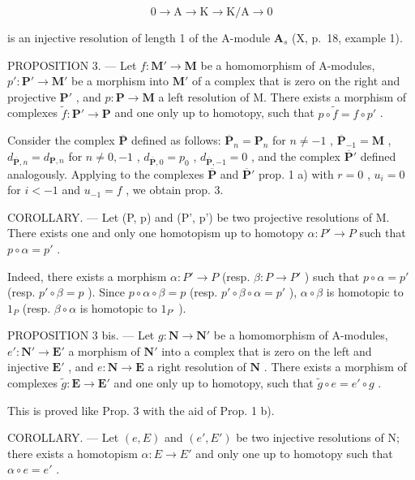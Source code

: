 \[
0 \rightarrow \mathrm{A} \rightarrow \mathrm{K} \rightarrow \mathrm{K/A} \rightarrow 0
\]

is an injective resolution of length 1 of the A-module \(\mathbf{A}_s\) (X, p.~18, example 1).

PROPOSITION 3. — Let \(f: \mathbf{M}' \to \mathbf{M}\) be a homomorphism of A-modules, \(p': \mathbf{P}' \to \mathbf{M}'\) be a morphism into \(\mathbf{M}'\) of a complex that is zero on the right and projective \(\mathbf{P}'\) , and \(p: \mathbf{P} \to \mathbf{M}\) a left resolution of M. There exists a morphism of complexes \(\tilde{f}: \mathbf{P}' \to \mathbf{P}\) and one only up to homotopy, such that \(p \circ \tilde{f} = f \circ p'\) .

Consider the complex \(\overline{\mathbf{P}}\) defined as follows: \(\overline{\mathbf{P}}_n = \mathbf{P}_n\) for \(n \neq -1\) , \(\overline{\mathbf{P}}_{-1} = \mathbf{M}\) , \(d_{\overline{\mathbf{P}},n} = d_{\mathbf{P},n}\) for \(n \neq 0, -1\) , \(d_{\overline{\mathbf{P}},0} = p_0\) , \(d_{\overline{\mathbf{P}},-1} = 0\) , and the complex \(\overline{\mathbf{P}}'\) defined analogously. Applying to the complexes \(\overline{\mathbf{P}}\) and \(\overline{\mathbf{P}}'\) prop. 1 a) with \(r=0\) , \(u_i = 0\) for \(i < -1\) and \(u_{-1} = f\) , we obtain prop. 3.

COROLLARY. — Let (P, p) and (P', p') be two projective resolutions of M. There exists one and only one homotopism up to homotopy \(\alpha: P' \to P\) such that \(p \circ \alpha = p'\) .

Indeed, there exists a morphism \(\alpha: P' \to P\) (resp. \(\beta: P \to P'\) ) such that \(p \circ \alpha = p'\) (resp. \(p' \circ \beta = p\) ). Since \(p \circ \alpha \circ \beta = p\) (resp. \(p' \circ \beta \circ \alpha = p'\) ), \(\alpha \circ \beta\) is homotopic to \(1_P\) (resp. \(\beta \circ \alpha\) is homotopic to \(1_{P'}\) ).

PROPOSITION 3 bis. — Let \(g: \mathbf{N} \to \mathbf{N}'\) be a homomorphism of A-modules, \(e': \mathbf{N}' \to \mathbf{E}'\) a morphism of \(\mathbf{N}'\) into a complex that is zero on the left and injective \(\mathbf{E}'\) , and \(e: \mathbf{N} \to \mathbf{E}\) a right resolution of \(\mathbf{N}\) . There exists a morphism of complexes \(\tilde{g}: \mathbf{E} \to \mathbf{E}'\) and one only up to homotopy, such that \(\tilde{g} \circ e = e' \circ g\) .

This is proved like Prop. 3 with the aid of Prop. 1 b).

COROLLARY. --- Let \((e, E)\) and \((e', E')\) be two injective resolutions of N; there exists a homotopism \(\alpha : E \to E'\) and only one up to homotopy such that \(\alpha \circ e = e'\) .

